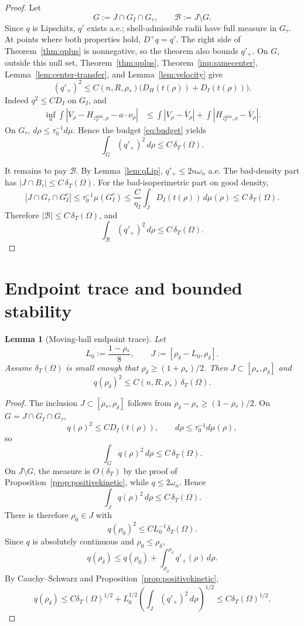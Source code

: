 \documentclass[11pt]{amsart}
\newtheorem{lemma}[theorem]{Lemma}
\theoremstyle{definition}
\newcommand{\Om}{\Omega}
\newcommand{\dT}{\delta_T}
\newcommand{\rstar}{\rho_*}
\newcommand{\rdel}{\rho_\delta}
\begin{document}
\begin{proof}
Let
\[
   G:=J\cap G_I\cap G_\tau,\qquad \mathcal B:=J\setminus G .
\]
Since \(q\) is Lipschitz, \(q'\) exists a.e.; shell-admissible radii have
full measure in \(G_\tau\).  At points where both properties hold,
\(D^+q=q'\).  The right side of Theorem~\ref{thm:qplus} is nonnegative,
so the theorem also bounds \(q'_+\).  On \(G\), outside this null set,
Theorem~\ref{thm:qplus}, Theorem~\ref{inp:samecenter},
Lemma~\ref{lem:center-transfer}, and Lemma~\ref{lem:velocity} give
\[
   (q'_+)^2
   \le C(n,R,\rstar)\bigl(D_H(t(\rho))+D_I(t(\rho))\bigr).
\]
Indeed \(q^2\le C D_I\) on \(G_I\), and
\[
\begin{aligned}
   \inf_a\int |V_\rho-H_{z_\rho^{\min},\rho}-a\cdot\nu_\rho|
   &\le
   \int |V_\rho-\bar V_\rho|
   +\int |H_{z_\rho^{\min},\rho}-\bar V_\rho|.
\end{aligned}
\]
On \(G_\tau\), \(d\rho\le\tau_0^{-1}d\mu\).  Hence the budget
\eqref{eq:budget} yields
\[
   \int_G(q'_+)^2\,d\rho\le C\,\dT(\Om).
\]

It remains to pay \(\mathcal B\).  By Lemma~\ref{lem:qLip},
\(q'_+\le2n\omega_n\) a.e.  The bad-density part has
\(|J\cap B_\tau|\le C\,\dT(\Om)\).  For the bad-isoperimetric part on
good density,
\[
   |J\cap G_\tau\cap G_I^c|
   \le \tau_0^{-1}\mu(G_I^c)
   \le \frac{C}{\eta_I}\int_JD_I(t(\rho))\,d\mu(\rho)
   \le C\,\dT(\Om).
\]
Therefore \(|\mathcal B|\le C\,\dT(\Om)\), and
\[
   \int_{\mathcal B}(q'_+)^2\,d\rho\le C\,\dT(\Om).
\]
\end{proof}

\section{Endpoint trace and bounded stability}\label{sec:endpoint}

\begin{lemma}[Moving-ball endpoint trace]\label{lem:endpoint}
Let
\[
   L_0:=\frac{1-\rstar}{8},\qquad
   J:=[\rdel-L_0,\rdel].
\]
Assume \(\dT(\Om)\) is small enough that
\(\rdel\ge(1+\rstar)/2\).  Then \(J\subset[\rstar,\rdel]\) and
\[
   q(\rdel)^2\le C(n,R,\rstar)\,\dT(\Om).
\]
\end{lemma}

\begin{proof}
The inclusion \(J\subset[\rstar,\rdel]\) follows from
\(\rdel-\rstar\ge(1-\rstar)/2\).  On \(G=J\cap G_I\cap G_\tau\),
\[
   q(\rho)^2\le C D_I(t(\rho)),\qquad
   d\rho\le\tau_0^{-1}d\mu(\rho),
\]
so
\[
   \int_G q(\rho)^2\,d\rho\le C\,\dT(\Om).
\]
On \(J\setminus G\), the measure is \(O(\dT)\) by the proof of
Proposition~\ref{prop:positivekinetic}, while \(q\le2\omega_n\).  Hence
\[
   \int_J q(\rho)^2\,d\rho\le C\,\dT(\Om).
\]
There is therefore \(\rho_0\in J\) with
\[
   q(\rho_0)^2\le C L_0^{-1}\dT(\Om).
\]
Since \(q\) is absolutely continuous and \(\rho_0\le\rdel\),
\[
   q(\rdel)
   \le q(\rho_0)+\int_{\rho_0}^{\rdel}q'_+(\rho)\,d\rho.
\]
By Cauchy--Schwarz and Proposition~\ref{prop:positivekinetic},
\[
   q(\rdel)
   \le C\dT(\Om)^{1/2}
      +L_0^{1/2}\left(\int_J(q'_+)^2\,d\rho\right)^{1/2}
   \le C\dT(\Om)^{1/2}.
\]
\end{proof}
\end{document}
